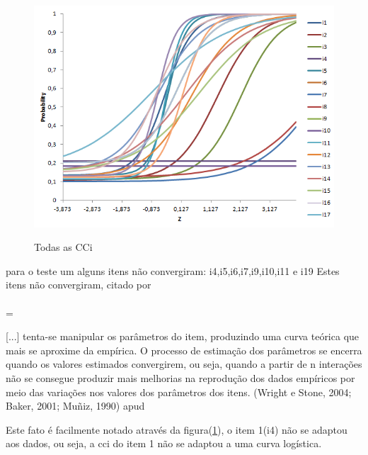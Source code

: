 	\paragraph{}
	\begin{figure}
	    \centering
	    \caption{Todas as CCi}
	    \includegraphics[width=0.5\linewidth]{img/all_cci}
	    \label{fig:all_cci}
	\end{figure}
	    
	para o teste um alguns itens não convergiram:
	i4,i5,i6,i7,i9,i10,i11 e i19
    Estes itens não convergiram,  citado por \textcite{Gleiber}\paragraph{}
   
			\newdimen\mylength
			\mylength = \linewidth
			\addtolength{\mylength}{-4.7cm}
			\hspace{4cm}\begin{minipage}{\mylength}
			    \linespread{1}
				\small{[...] tenta-se manipular os parâmetros do item, produzindo uma curva teórica que mais se aproxime da empírica. O processo de estimação dos parâmetros se encerra quando os valores estimados convergirem, ou seja, quando a partir de n interações não se consegue produzir mais melhorias na reprodução dos dados empíricos por meio das variações nos valores dos parâmetros dos itens. (Wright e Stone, 2004; Baker, 2001; Muñiz, 1990) apud \cite{Gleiber}}
				
			\end{minipage}
		Este fato é facilmente notado através da figura(\ref{fig:all_cci}), o item 1(i4) não se adaptou aos dados, ou seja, a cci do item 1 não se adaptou a uma curva logística.
   \paragraph{}
   
